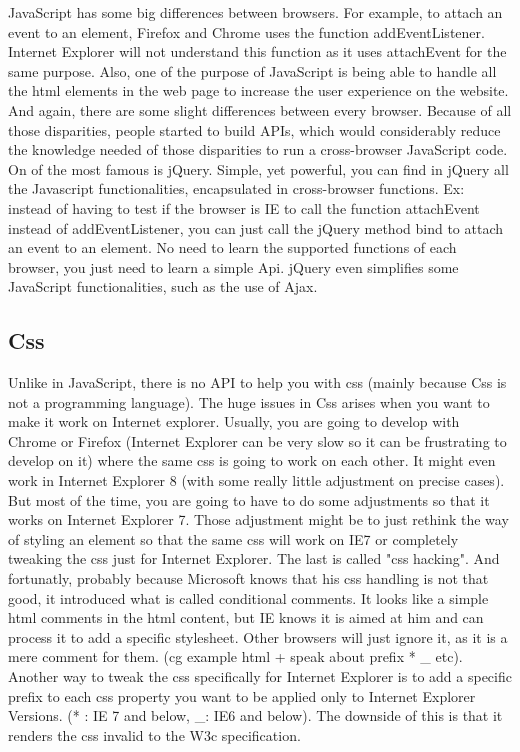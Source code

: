 JavaScript has some big differences between browsers. For example, to attach an event to an element, Firefox and Chrome uses the function addEventListener. Internet Explorer will not understand this function as it uses attachEvent for the same purpose. %
Also, one of the purpose of JavaScript is being able to handle all the html elements in the web page to increase the user experience on the website. And again, there are some slight differences between every browser.
Because of all those disparities, people started to build APIs, which would considerably reduce the knowledge needed of those disparities to run a cross-browser JavaScript code. On of the most famous is jQuery. Simple, yet powerful, you can find in jQuery all the Javascript functionalities, encapsulated in cross-browser functions. Ex: instead of having to test if the browser is IE to call the function attachEvent instead of addEventListener, you can just call the jQuery method bind to attach an event to an element. No need to learn the supported functions of each browser, you just need to learn a simple Api. jQuery even simplifies some JavaScript functionalities, such as the use of Ajax.

\subsection{Css}

Unlike in JavaScript, there is no API to help you with css (mainly because Css is not a programming language). The huge issues in Css arises when you want to make it work on Internet explorer. Usually, you are going to develop with Chrome or Firefox (Internet Explorer can be very slow so it can be frustrating to develop on it) where the same css is going to work on each other. It might even work in Internet Explorer 8 (with some really little adjustment on precise cases). But most of the time, you are going to have to do some adjustments so that it works on Internet Explorer 7. Those adjustment might be to just rethink the way of styling an element so that the same css will work on IE7 or completely tweaking the css just for Internet Explorer. The last is called "css hacking". And fortunatly, probably because Microsoft knows that his css handling is not that good, it introduced what is called conditional comments. It looks like a simple html comments in the html content, but IE knows it is aimed at him and can process it to add a specific stylesheet. Other browsers will just ignore it, as it is a mere comment for them. (cg example html + speak about prefix * \_ etc). Another way to tweak the css specifically for Internet Explorer is to add a specific prefix to each css property you want to be applied only to Internet Explorer Versions. (* : IE 7 and below, _: IE6 and below). The downside of this is that it renders the css invalid to the W3c specification.

